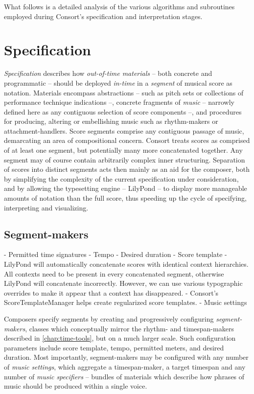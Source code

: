 What follows is a detailed analysis of the various algorithms and subroutines
employed during Consort's specification and interpretation stages.

\section{Specification}
\label{sec:specification}

\emph{Specification} describes how \emph{out-of-time materials} -- both
concrete and programmatic -- should be deployed \emph{in-time} in a
\emph{segment} of musical score as notation. Materials encompass abstractions
-- such as pitch sets or collections of performance technique indications --,
concrete fragments of \emph{music} -- narrowly defined here as any contiguous
selection of score components --, and procedures for producing, altering or
embellishing music such as rhythm-makers or attachment-handlers. Score segments
comprise any contiguous passage of music, demarcating an area of compositional
concern. Consort treats scores as comprised of at least one segment, but
potentially many more concatenated together. Any segment may of course contain
arbitrarily complex inner structuring. Separation of scores into distinct
segments acts then mainly as an aid for the composer, both by simplifying the
complexity of the current specification under consideration, and by allowing
the typesetting engine -- LilyPond -- to display more manageable amounts of
notation than the full score, thus speeding up the cycle of specifying,
interpreting and visualizing.

\subsection{Segment-makers}
\label{ssec:segment-makers}

\begin{markdown}
-   Permitted time signatures
-   Tempo
-   Desired duration
-   Score template
    -   LilyPond will automatically concatenate scores with identical
        context hierarchies. All contexts need to be present in every
        concatenated segment, otherwise LilyPond will concatenate
        incorrectly. However, we can use various typographic overrides to
        make it appear that a context has disappeared.
    -   Consort's ScoreTemplateManager helps create regularized score
        templates.
-   Music settings
\end{markdown}

Composers specify segments by creating and progressively configuring
\emph{segment-makers}, classes which conceptually mirror the rhythm- and
timespan-makers described in \autoref{chap:time-tools}, but on a much larger
scale. Such configuration parameters include score template, tempo, permitted
meters, and desired duration. Most importantly, segment-makers may be
configured with any number of \emph{music settings}, which aggregate a
timespan-maker, a target timespan and any number of \emph{music specifiers} --
bundles of materials which describe how phrases of music should be produced
within a single voice. 

